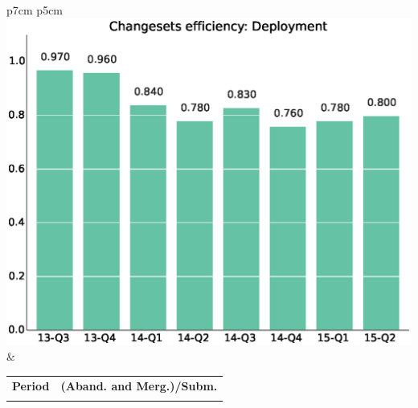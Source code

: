 \documentclass[a4wide,11pt]{article}
\begin{document}
\begin{tabular}{p{7cm} p{5cm}}
    \vspace{0pt} 
    \includegraphics[scale=.35]{figs/bmiscrDeployment.eps}
    & 
    \vspace{0pt}
    \begin{tabular}{l|l}%
    \bfseries Period & \bfseries (Aband. and Merg.)/Subm. %
    \csvreader[head to column names]{data/submitted_reviewsDeployment.csv}{}%
    {\\ & \bmi}
    \end{tabular}
\end{tabular}
\end{document}
